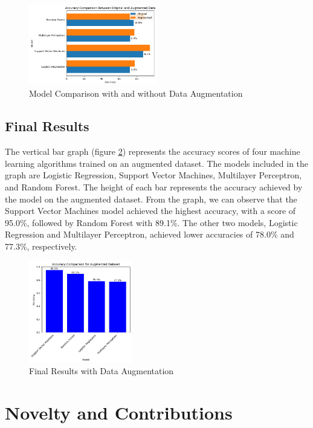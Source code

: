 \documentclass[conference]{IEEEtran}
\begin{document}
\begin{figure}[!h]
    \centering
    \includegraphics[width=0.5\textwidth]{assets/originalvsaugmented.png}
    \caption{Model Comparison with and without Data Augmentation}
    \label{fig:augmentation-comparison}
\end{figure}

\subsection{Final Results}

The vertical bar graph (figure \ref{fig:final-results}) represents the accuracy scores of four machine learning algorithms trained on an augmented dataset. The models included in the graph are Logistic Regression, Support Vector Machines, Multilayer Perceptron, and Random Forest. The height of each bar represents the accuracy achieved by the model on the augmented dataset. From the graph, we can observe that the Support Vector Machines model achieved the highest accuracy, with a score of 95.0\%, followed by Random Forest with 89.1\%. The other two models, Logistic Regression and Multilayer Perceptron, achieved lower accuracies of 78.0\% and 77.3\%, respectively. 

\begin{figure}[!h]
    \centering
    \includegraphics[width=0.4\textwidth]{assets/augmented-results.png}
    \caption{Final Results with Data Augmentation}
    \label{fig:final-results}
\end{figure}
\section{Novelty and Contributions}
\end{document}
